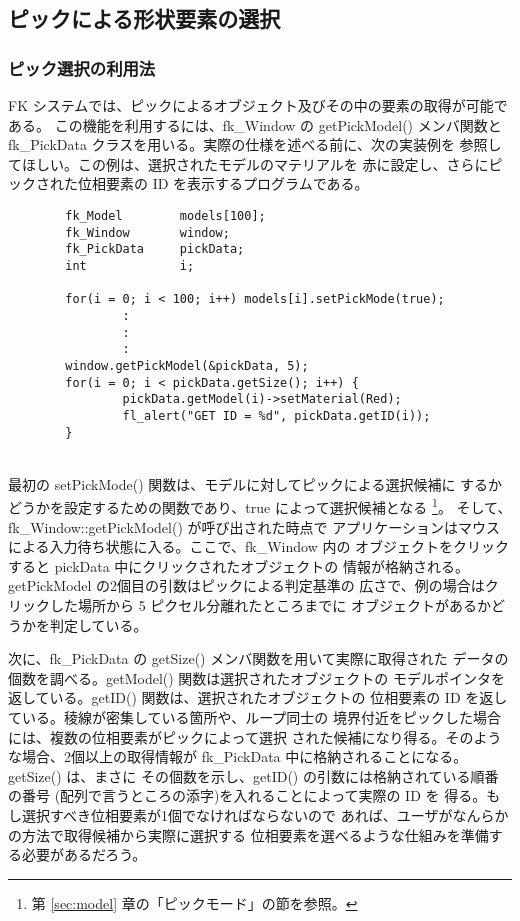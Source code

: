 \subsection{ピックによる形状要素の選択}
\subsubsection{ピック選択の利用法} \label{sec:pickexam}
FK システムでは、ピックによるオブジェクト及びその中の要素の取得が可能である。
この機能を利用するには、fk\_Window の getPickModel() メンバ関数と
fk\_PickData クラスを用いる。実際の仕様を述べる前に、次の実装例を
参照してほしい。この例は、選択されたモデルのマテリアルを
赤に設定し、さらにピックされた位相要素の ID を表示するプログラムである。
\\
\begin{breakbox}
\begin{verbatim}
        fk_Model        models[100];
        fk_Window       window;
        fk_PickData     pickData;
        int             i;

        for(i = 0; i < 100; i++) models[i].setPickMode(true);
                :
                :
                :
        window.getPickModel(&pickData, 5);
        for(i = 0; i < pickData.getSize(); i++) {
                pickData.getModel(i)->setMaterial(Red);
                fl_alert("GET ID = %d", pickData.getID(i));
        }
\end{verbatim}
\end{breakbox}
~ \\
最初の setPickMode() 関数は、モデルに対してピックによる選択候補に
するかどうかを設定するための関数であり、true によって選択候補となる
\footnote{第 \ref{sec:model} 章の「ピックモード」の節を参照。}。
そして、fk\_Window::getPickModel() が呼び出された時点で
アプリケーションはマウスによる入力待ち状態に入る。ここで、fk\_Window 内の
オブジェクトをクリックすると pickData 中にクリックされたオブジェクトの
情報が格納される。getPickModel の2個目の引数はピックによる判定基準の
広さで、例の場合はクリックした場所から 5 ピクセル分離れたところまでに
オブジェクトがあるかどうかを判定している。

次に、fk\_PickData の getSize() メンバ関数を用いて実際に取得された
データの個数を調べる。getModel() 関数は選択されたオブジェクトの
モデルポインタを返している。getID() 関数は、選択されたオブジェクトの
位相要素の ID を返している。稜線が密集している箇所や、ループ同士の
境界付近をピックした場合には、複数の位相要素がピックによって選択
された候補になり得る。そのような場合、2個以上の取得情報が
fk\_PickData 中に格納されることになる。getSize() は、まさに
その個数を示し、getID() の引数には格納されている順番の番号
(配列で言うところの添字)を入れることによって実際の ID を
得る。もし選択すべき位相要素が1個でなければならないので
あれば、ユーザがなんらかの方法で取得候補から実際に選択する
位相要素を選べるような仕組みを準備する必要があるだろう。

